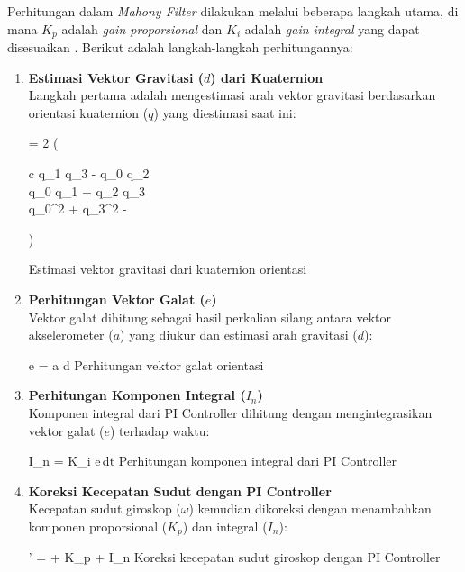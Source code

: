 Perhitungan dalam \textit{Mahony Filter} dilakukan melalui beberapa langkah utama, di mana $K_p$ adalah \textit{gain proporsional} dan $K_i$ adalah \textit{gain integral} yang dapat disesuaikan \cite{MinhLongHoang2022}. Berikut adalah langkah-langkah perhitungannya:

\begin{enumerate}
	\item \textbf{Estimasi Vektor Gravitasi ($d$) dari Kuaternion}\\
	Langkah pertama adalah mengestimasi arah vektor gravitasi berdasarkan orientasi kuaternion ($q$) yang diestimasi saat ini:
	\begin{equationcaptioned}[eq:2.estimasiVektorGravitasi]{
			 = 2
			\left(
			\begin{array}{c}
				q_{1} q_{3} - q_{0} q_{2} \\
				q_{0} q_{1} + q_{2} q_{3} \\
				q_{0}^{2} + q_{3}^{2} - 
			\end{array}
			\right)
		}{
			Estimasi vektor gravitasi dari kuaternion orientasi \cite{MinhLongHoang2022}
		}
	\end{equationcaptioned}
	
	\item \textbf{Perhitungan Vektor Galat ($e$)}\\
	Vektor galat dihitung sebagai hasil perkalian silang antara vektor akselerometer ($a$) yang diukur dan estimasi arah gravitasi ($d$):
	\begin{equationcaptioned}[eq:2.perhitunganVektorKesalahan]{
			e = a \times d
		}{
			Perhitungan vektor galat orientasi \cite{MinhLongHoang2022}
		}
	\end{equationcaptioned}
	
	\item \textbf{Perhitungan Komponen Integral ($I_n$)}\\
	Komponen integral dari PI Controller dihitung dengan mengintegrasikan vektor galat ($e$) terhadap waktu:
	\begin{equationcaptioned}[eq:2.perhitunganVektorIntegrasi]{
			I_n = K_i \int e\,dt
		}{
			Perhitungan komponen integral dari PI Controller \cite{MinhLongHoang2022}
		}
	\end{equationcaptioned}
	
	\item \textbf{Koreksi Kecepatan Sudut dengan PI Controller}\\
	Kecepatan sudut giroskop ($\omega$) kemudian dikoreksi dengan menambahkan komponen proporsional ($K_p$) dan integral ($I_n$):
	\begin{equationcaptioned}[eq:2.koreksiPiController]{
			\omega' = \omega + K_p + I_n
		}{
			Koreksi kecepatan sudut giroskop dengan PI Controller \cite{MinhLongHoang2022}
		}
	\end{equationcaptioned}
	

\end{enumerate}
